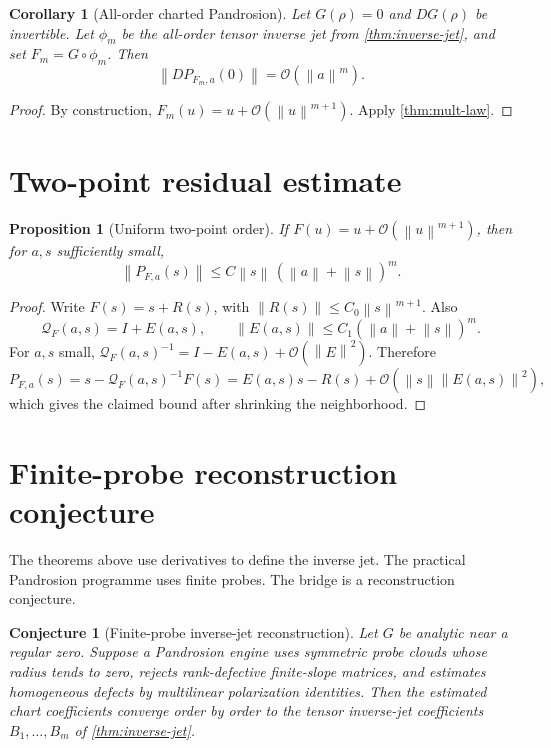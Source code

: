 \documentclass[11pt]{article}
\newtheorem{proposition}[definition]{Proposition}
\newtheorem{corollary}[definition]{Corollary}
\newtheorem{conjecture}[definition]{Conjecture}
\newcommand{\Oterm}{\mathcal O}
\newcommand{\Q}{\mathcal Q}
\newcommand{\norm}[1]{\left\lVert #1\right\rVert}
\begin{document}
\begin{corollary}[All-order charted Pandrosion]\label{cor:charted}
Let \(G(\rho)=0\) and \(DG(\rho)\) be invertible. Let \(\phi_m\) be the all-order tensor inverse jet from \cref{thm:inverse-jet}, and set \(F_m=G\circ\phi_m\). Then
\[
        \norm{D P_{F_m,a}(0)}=\Oterm(\norm{a}^{m}).
\]
\end{corollary}

\begin{proof}
By construction, \(F_m(u)=u+\Oterm(\norm{u}^{m+1})\). Apply \cref{thm:mult-law}.
\end{proof}

\section{Two-point residual estimate}

\begin{proposition}[Uniform two-point order]\label{prop:two-point}
If \(F(u)=u+\Oterm(\norm{u}^{m+1})\), then for \(a,s\) sufficiently small,
\[
        \norm{P_{F,a}(s)}
        \le
        C\norm{s}\,(\norm{a}+\norm{s})^m.
\]
\end{proposition}

\begin{proof}
Write \(F(s)=s+R(s)\), with \(\norm{R(s)}\le C_0\norm{s}^{m+1}\). Also
\[
        \Q_F(a,s)=I+E(a,s),
        \qquad
        \norm{E(a,s)}\le C_1(\norm{a}+\norm{s})^m.
\]
For \(a,s\) small, \(\Q_F(a,s)^{-1}=I-E(a,s)+\Oterm(\norm{E}^2)\). Therefore
\[
        P_{F,a}(s)=s-\Q_F(a,s)^{-1}F(s)
        =
        E(a,s)s-R(s)+\Oterm(\norm{s}\norm{E(a,s)}^2),
\]
which gives the claimed bound after shrinking the neighborhood.
\end{proof}

\section{Finite-probe reconstruction conjecture}

The theorems above use derivatives to define the inverse jet. The practical Pandrosion programme uses finite probes. The bridge is a reconstruction conjecture.

\begin{conjecture}[Finite-probe inverse-jet reconstruction]
Let \(G\) be analytic near a regular zero. Suppose a Pandrosion engine uses symmetric probe clouds whose radius tends to zero, rejects rank-defective finite-slope matrices, and estimates homogeneous defects by multilinear polarization identities. Then the estimated chart coefficients converge order by order to the tensor inverse-jet coefficients \(B_1,\ldots,B_m\) of \cref{thm:inverse-jet}.
\end{conjecture}
\end{document}
